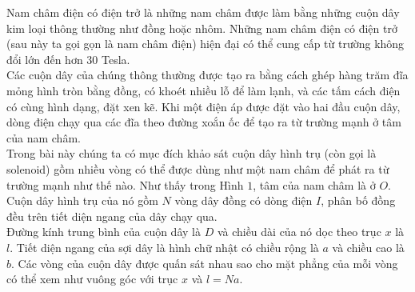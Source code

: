 \begin{vd}%
Nam châm điện có điện trở là những nam châm được làm bằng những cuộn dây kim loại thông thường như đồng hoặc nhôm. Những nam châm điện có điện trở (sau này ta gọi gọn là nam châm điện) hiện đại có thể cung cấp từ trường không đổi lớn đến hơn $30$ Tesla. \\
Các cuộn dây của chúng thông thường được tạo ra bằng cách ghép hàng trăm đĩa mỏng hình tròn bằng đồng, có khoét nhiều lỗ để làm lạnh, và các tấm cách điện có cùng hình dạng, đặt xen kẽ. Khi một điện áp được đặt vào hai đầu cuộn dây, dòng điện chạy qua các đĩa theo đường xoắn ốc để tạo ra từ trường mạnh ở tâm của nam châm.\\

Trong bài này chúng ta có mục đích khảo sát cuộn dây hình trụ (còn gọi là solenoid) gồm nhiều vòng có thể được dùng như một nam châm để phát ra từ trường mạnh như thế nào. Như thấy trong Hình $1$, tâm của nam châm là ở $O$. Cuộn dây hình trụ của nó gồm $N$ vòng dây đồng có dòng điện $I$, phân bố đồng đều trên tiết diện ngang của dây chạy qua. \\
Đường kính trung bình của cuộn dây là $D$ và chiều dài của nó dọc theo trục $x$ là $l$. Tiết diện ngang của sợi dây là hình chữ nhật có chiều rộng là $a$ và chiều cao là $b$. Các vòng của cuộn dây được quấn sát nhau sao cho mặt phẳng của mỗi vòng có thể xem như vuông góc với trục $x$ và $l=Na$. \\


\end{vd}

